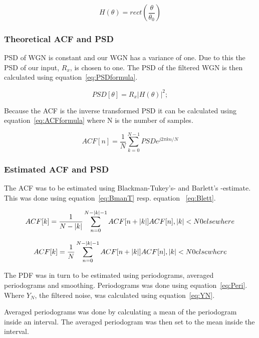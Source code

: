 \documentclass[10pt]{article}
\begin{document}
\begin{equation}
  \label{eq:idealH}
  H(\theta) =rect(\frac{\theta}{\theta_0} )
\end{equation}

\subsubsection{Theoretical ACF and PSD}
PSD of WGN is constant and our WGN has a variance of one. Due to this the PSD of our input, $R_x$, is chosen to one.
The PSD of the filtered WGN is then calculated using equation~\ref{eq:PSDformula}.

\begin{equation}
  \label{eq:PSDformula}
  PSD[\theta] = R_x|H(\theta)|^2;
\end{equation}

Because the ACF is the inverse transformed PSD it can be calculated using equation~\ref{eq:ACFformula} where N is the number of samples.

\begin{equation}
  \label{eq:ACFformula}
  ACF[n] = \frac{1}{N}\sum_{k=0}^{N-1}PSDe^{j2\pi kn/N}
\end{equation}

\subsubsection{Estimated ACF and PSD}
The ACF was to be estimated using Blackman-Tukey's- and Barlett's -estimate. This was done using equation~\ref{eq:BmanT} resp. equation ~\ref{eq:Blett}.

\begin{equation}
\label{eq:BmanT}
ACF[k] = \frac{1}{N-|k|}\sum_{n=0}^{N-|k|-1}ACF[n+|k|]ACF[n], |k|<N \\
		0 elsewhere
\end{equation}

\begin{equation}
\label{eq:Blett}
ACF[k] = \frac{1}{N}\sum_{n=0}^{N-|k|-1}ACF[n+|k|]ACF[n], |k|<N \\
		0 elsewhere
\end{equation}



The PDF was in turn to be estimated using periodograms, averaged periodograms and smoothing. Periodograms was done using equation~\ref{eq:Peri}. Where $Y_N$, the filtered noise, was calculated using equation~\ref{eq:YN}.

Averaged periodograms was done by calculating a mean of the periodogram inside an interval. The averaged periodogram was then set to the mean inside the interval.
\end{document}
